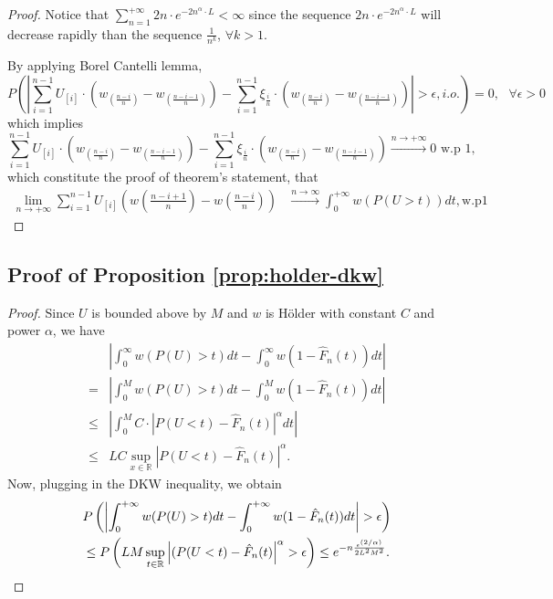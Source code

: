 \begin{proof}
Notice that $\sum_{n=1}^{+\infty}  2n \cdot e^{-2n^{\alpha}\cdot L}< \infty$ since the sequence 
$2n \cdot e^{-2n^{\alpha}\cdot L}$ will decrease rapidly than the sequence
$\frac{1}{n^k}$, $\forall k>1$.

By applying Borel Cantelli lemma,
$$
P ( \left| \sum_{i=1}^{n-1} U_{[i]} \cdot (w_{(\frac{n-i}{n})} - w_{(\frac{n-i-1}{n})}) -
\sum_{i=1}^{n-1} \xi_{\frac{i}{n}} \cdot (w_{(\frac{n-i}{n})} - w_{(\frac{n-i-1}{n})}) \right| >
\epsilon , i.o.) =0 , \text{   } \forall \epsilon >0 $$
which implies 
$$
\sum_{i=1}^{n-1} U_{[i]} \cdot (w_{(\frac{n-i}{n})} - w_{(\frac{n-i-1}{n})}) - \sum_{i=1}^{n-1}
\xi_{\frac{i}{n}} \cdot (w_{(\frac{n-i}{n})} - w_{(\frac{n-i-1}{n})}) \xrightarrow{n \rightarrow
+\infty} 0 \text{   w.p } 1 ,
$$
which constitute the proof of theorem's statement, that 
\begin{align}
\lim_{n\rightarrow +\infty} \sum_{i=1}^{n-1} U_{ [i ] } (w(\frac{n-i+1}{n})- w(\frac{n-i}{n}))
&\xrightarrow{n \rightarrow\infty} \int_0^{+\infty} w(P(U>t)) dt, \text{w.p} 1
\end{align}

\end{proof}


\subsection*{Proof of Proposition \ref{prop:holder-dkw}}
\begin{proof}

Since $U$ is bounded above by $M$ and $w$ is H\"{o}lder with constant $C$ and power $\alpha$, we have
\begin{align*}
&\left|\int_0^{\infty} w(P(U)>t) dt- \int_0^{\infty} w(1- {\hat F_n}(t)) dt\right| \\ = &
    \left|\int_0^M w(P(U)>t) dt- \int_0^M w(1- {\hat F_n}(t)) dt\right| \\
\leq& \left|\int_0^M C\cdot |P(U<t)-{\hat F_n}(t)|^\alpha dt\right|\\ \leq& LC\sup_{x\in
\mathbb{R}}\left|P(U<t)-{\hat F_n}(t)\right|^\alpha.
\end{align*}
Now, plugging in the DKW inequality, we obtain
\begin{align}
&
P\left(\left|\intinfinity w(P(U)>t) dt- \intinfinity w(1- {\hat F_n}(t)) dt\right|>\epsilon\right)
\nonumber\\
& \leq P\left(LM\sup_{t\in \mathbb{R}} \left|(P(U<t)-{\hat F_n}(t)\right|^\alpha>\epsilon\right)
\leq  e^{-n \frac{\epsilon ^{(2/\alpha)}} {2 L^2 M^2}}.\label{eq:dkw3}
\end{align}
\end{proof}


